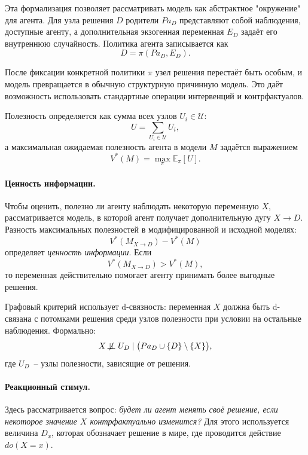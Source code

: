 Эта формализация позволяет рассматривать модель как абстрактное "окружение" для агента.  
Для узла решения $D$ родители $Pa_D$ представляют собой наблюдения, доступные агенту,  
а дополнительная экзогенная переменная $E_D$ задаёт его внутреннюю случайность.  
Политика агента записывается как
\begin{equation}
    D = \pi(Pa_D, E_D).
\end{equation}

После фиксации конкретной политики $\pi$ узел решения перестаёт быть особым,  
и модель превращается в обычную структурную причинную модель.  
Это даёт возможность использовать стандартные операции интервенций и контрфактуалов.

Полезность определяется как сумма всех узлов $U_i \in \mathcal{U}$:
\begin{equation}
    U = \sum_{U_i \in \mathcal{U}} U_i,
\end{equation}
а максимальная ожидаемая полезность агента в модели $M$ задаётся выражением
\begin{equation}
    V^*(M) = \max_{\pi} \mathbb{E}_{\pi}[U].
\end{equation}

\paragraph{Ценность информации.}  
Чтобы оценить, полезно ли агенту наблюдать некоторую переменную $X$,  
рассматривается модель, в которой агент получает дополнительную дугу $X \to D$.  
Разность максимальных полезностей в модифицированной и исходной моделях:
\begin{equation}
    V^*(M_{X \to D}) - V^*(M)
\end{equation}
определяет \emph{ценность информации}.  
Если
\begin{equation}
    V^*(M_{X \to D}) > V^*(M),
\end{equation}
то переменная действительно помогает агенту принимать более выгодные решения.  

Графовый критерий использует d-связность: переменная $X$ должна быть d-связана  
с потомками решения среди узлов полезности при условии на остальные наблюдения.  
Формально:
\begin{equation}
    X \not\!\perp\!\!\!\perp U_D \mid \bigl(Pa_D \cup \{D\} \setminus \{X\}\bigr),
\end{equation}
где $U_D$~-- узлы полезности, зависящие от решения.  


\paragraph{Реакционный стимул.}  
Здесь рассматривается вопрос: \emph{будет ли агент менять своё решение,  
если некоторое значение $X$ контрфактуально изменится?}  
Для этого используется величина $D_x$,  
которая обозначает решение в мире, где проводится действие $do(X = x)$.  

